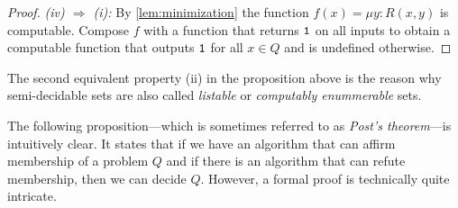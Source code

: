 \begin{proof}
  \emph{(iv) \(⇒\) (i):} By \cref{lem:minimization} the function \(f(x) = μy :
  R(x, y)\) is computable. Compose \(f\) with a function that returns \(\mathtt{1}\)
  on all inputs to obtain a computable function that outputs \(\mathtt{1}\) for all
  \(x ∈ Q\) and is undefined otherwise.
\end{proof}



\begin{rem}
  The second equivalent property (ii) in the proposition above is the reason why
  semi-de\-cid\-able sets are also called \emph{listable} or \emph{computably
  enummerable} sets.
\end{rem}

The following proposition---which is sometimes referred to as \emph{Post's
theorem}---is intuitively clear. It states that if we have an algorithm
that can affirm membership of a problem \(Q\) and if there is an algorithm that
can refute membership, then we can decide \(Q\). However, a formal proof is
technically quite intricate.

